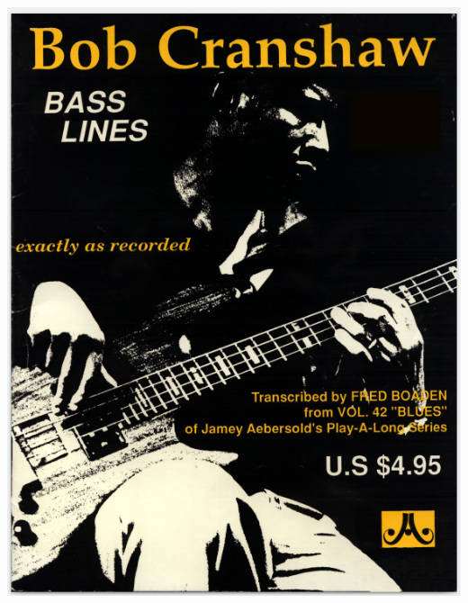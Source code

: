 \documentclass[a4paper]{book}
\begin{document}
\begin{center}
\includegraphics[width=15.051cm,height=19.523cm]{lebluessupportsmethodes-img145.png}
\end{center}
\end{document}
